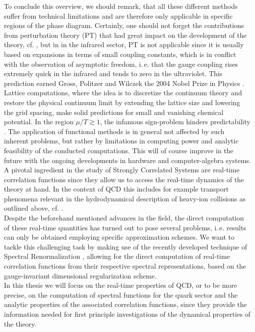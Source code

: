 To conclude this overview, we should remark, that all these different methods suffer from technical limitations and are therefore only applicable in specific regions of the phase diagram. Certainly, one should not forget the contributions from perturbation theory (PT) that had great impact on the development of the theory, cf. \cite{EllisGeorgiMachacekPolitzerRoss1979,BernardGolterman1992}, but in in the infrared sector, PT is not applicable since it is usually based on expansions in terms of small coupling constants, which is in conflict with the observation of asymptotic freedom, i.\,e. that the gauge coupling rises extremely quick in the infrared and tends to zero in the ultraviolet. This prediction earned Gross, Politzer and Wilczek the 2004 Nobel Prize in Physics \cite{Politzer1973, GrossWilczek1973}. Lattice computations, where the idea is to discretize the continuum theory and restore the physical continuum limit by extending the lattice size and lowering the grid spacing, make solid predictions for small and vanishing chemical potential. In the region $\mu/T\gtrsim 1$, the infamous sign-problem hinders predictability \cite{Philipsen2007, deForcrand2010}. The application of functional methods is in general not affected by such inherent problems, but rather by limitations in computing power and analytic feasibility of the conducted computations. This will of course improve in the future with the ongoing developments in hardware and computer-algebra systems.\\
A pivotal ingredient in the study of Strongly Correlated Systems are real-time correlation functions since they allow us to access the real-time dynamics of the theory at hand. In the context of QCD this includes for example transport phenomena relevant in the hydrodynamical description of heavy-ion collisions as outlined above, cf. \cite{AyikNorenbergWolschin1977, Xu2019}.\\  
Despite the beforehand mentioned advances in the field, the direct computation of these real-time quantities has turned out to pose several problems, i.\,e. results can only be obtained employing specific approximation schemes. We want to tackle this challenging task by making use of the recently developed technique of Spectral Renormalization \cite{Horak2019, Wink2020, HorakPawlowskiWink2020}, allowing for the direct computation of real-time correlation functions from their respective spectral representations, based on the gauge-invariant dimensional regularization scheme.\\
In this thesis we will focus on the real-time properties of QCD, or to be more precise, on the computation of spectral functions for the quark sector and the analytic properties of the associated correlation functions, since they provide the information needed for first principle investigations of the dynamical properties of the theory.\\

